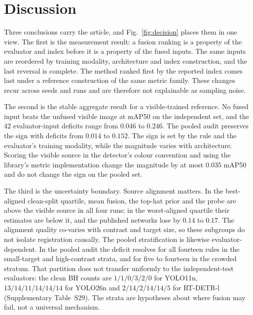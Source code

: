 \documentclass[journal]{IEEEtran}
\begin{document}
\section{Discussion}
\label{sec:discussion}

\begin{sloppypar}
Three conclusions carry the article, and Fig.~\ref{fig:decision} places them in one
view. The first is the measurement result: a fusion ranking is a property of the
evaluator and index before it is a property of the fused inputs. The same inputs are
reordered by training modality, architecture and index construction, and the last
reversal is complete. The method ranked first by the reported index comes last under a
reference construction of the same metric family. These changes recur across seeds and
runs and are therefore not explainable as sampling noise.

The second is the stable aggregate result for a visible-trained reference. No fused
input beats the unfused visible image at mAP50 on the independent set, and the 42
evaluator-input deficits range from $0.046$ to $0.246$. The pooled audit preserves
the sign with deficits from $0.014$ to $0.152$. The sign is set by the rule and the evaluator's
training modality, while the magnitude varies with architecture. Scoring the visible
source in the detector's colour convention and using the library's metric implementation
change the magnitude by at most $0.035$ mAP50 and do not change the sign on the pooled
set.

The third is the uncertainty boundary. Source alignment matters. In the best-aligned
clean-split quartile, mean fusion, the top-hat prior and the probe are above the
visible source in all four runs; in the worst-aligned quartile their estimates are
below it, and the published networks lose by $0.14$ to $0.17$. The alignment quality
co-varies with contrast and target size, so these subgroups do not isolate registration
causally. The pooled stratification is likewise evaluator-dependent. In the pooled
audit the deficit resolves for all fourteen rules in the small-target and
high-contrast strata, and for five to fourteen in the crowded stratum. That partition
does not transfer uniformly to the independent-test evaluators: the clean BH counts
are $1/1/0/3/2/0$ for YOLO11n, $13/14/11/14/14/14$ for YOLO26n and
$2/14/2/14/14/5$ for RT-DETR-l (Supplementary Table~S29). The strata are hypotheses
about where fusion may fail, not a universal mechanism.

\begin{figure}[!t]\centering


\end{figure}
\end{sloppypar}
\end{document}
